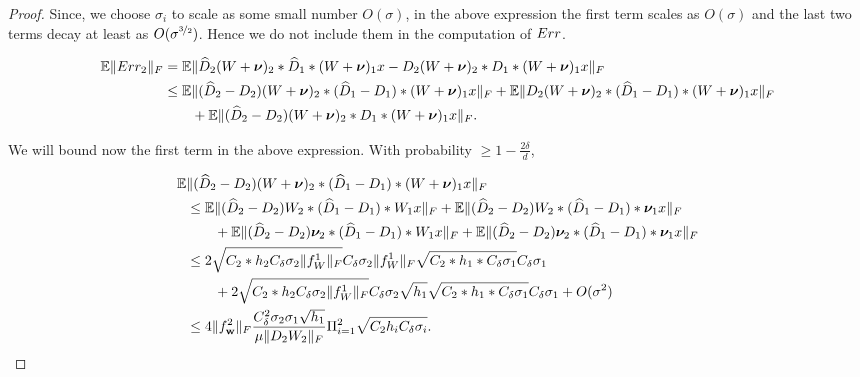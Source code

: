 \documentclass{article}
\begin{document}
\begin{proof}
Since, we choose $\sigma_i$ to scale as some small number $O(\sigma)$, in the above expression the first term scales as $O(\sigma)$ and the last two terms decay at least as $O(\sigma^{\nicefrac{3}{2}})$. Hence we do not include them in the computation of $Err$.
 
\begin{align*}
\mathbb{E} \| Err_2 \|_F &= \mathbb{E} \|\widehat{D}_2(W+\boldsymbol{\nu})_2 *\widehat{D}_1*(W+\boldsymbol{\nu})_1 x - D_2(W+\boldsymbol{\nu})_2 *D_1*(W+\boldsymbol{\nu})_1 x \|_F \\
&\leq \mathbb{E} \| (\widehat{D}_2-D_2)(W+\boldsymbol{\nu})_2 *(\widehat{D}_1-D_1)*(W+\boldsymbol{\nu})_1 x\|_F  + \mathbb{E} \| D_2(W+\boldsymbol{\nu})_2 *(\widehat{D}_1-D_1)*(W+\boldsymbol{\nu})_1 x\|_F \\ & \quad \quad+ \mathbb{E} \| (\widehat{D}_2-D_2)(W+\boldsymbol{\nu})_2 *D_1*(W+\boldsymbol{\nu})_1 x\|_F.
\end{align*}

We will bound now the first term in the above expression. With probability $\geq 1-\frac{2\delta}{d}$,

\begin{align*}
\mathbb{E} & \| (\widehat{D}_2-D_2)(W+\boldsymbol{\nu})_2 *(\widehat{D}_1-D_1)*(W+\boldsymbol{\nu})_1 x\|_F \\
&\leq \mathbb{E} \| (\widehat{D}_2-D_2)W_2 *(\widehat{D}_1-D_1)*W_1 x\|_F + \mathbb{E} \| (\widehat{D}_2-D_2)W_2 *(\widehat{D}_1-D_1)*\boldsymbol{\nu}_1 x\|_F \\ & \quad \quad + \mathbb{E} \| (\widehat{D}_2-D_2)\boldsymbol{\nu}_2 *(\widehat{D}_1-D_1)*W_1 x\|_F + \mathbb{E} \| (\widehat{D}_2-D_2)\boldsymbol{\nu}_2 *(\widehat{D}_1-D_1)*\boldsymbol{\nu}_1 x\|_F \\
&\leq  2 \sqrt{C_2*h_2 C_{\delta} \sigma_2  \|f^1_W\|_F }C_{\delta} \sigma_2  \|f^1_W\|_F \sqrt{C_2*h_1 *C_{\delta} \sigma_1}C_{\delta} \sigma_1 \\ & \quad \quad + 2 \sqrt{C_2*h_2 C_{\delta} \sigma_2  \|f^1_W\|_F }C_{\delta} \sigma_2  \sqrt{h_1} \sqrt{C_2*h_1 *C_{\delta} \sigma_1}C_{\delta} \sigma_1 +O(\sigma^2)\\
&\leq  4 \|f_{\mathbf{w}}^2\|_F \frac{C^2_{\delta} \sigma_2 \sigma_1 \sqrt{h_1}}{\mu \|D_2 W_2\|_F} \Pi_{i=1}^2 \sqrt{C_2 h_i C_{\delta} \sigma_i}.
\end{align*}





\end{proof}
\end{document}
